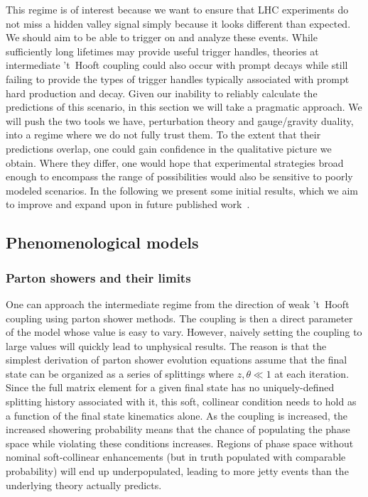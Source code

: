 This regime is of interest because we want to ensure that LHC experiments do not miss a hidden valley signal simply because it looks different than expected. We should aim to be able to trigger on and analyze these events. While sufficiently long lifetimes may provide useful trigger handles, theories at intermediate 't~Hooft coupling could also occur with prompt decays while still failing to provide the types of trigger handles typically associated with prompt hard production and decay. Given our inability to reliably calculate the predictions of this scenario, in this section we will take a pragmatic approach. We will push the two tools we have, perturbation theory and gauge/gravity duality, into a regime where we do not fully trust them. To the extent that their predictions overlap, one could gain confidence in the qualitative picture we obtain. Where they differ, one would hope that experimental strategies broad enough to encompass the range of possibilities would also be sensitive to poorly modeled scenarios. In the following we present some initial results, which we aim to improve and expand upon in future published work~\cite{showersinprogress}.


\subsection{Phenomenological models}

\subsubsection{Parton showers and their limits}

One can  approach the intermediate regime from the direction of weak 't~Hooft coupling using parton shower methods. The coupling is then a direct parameter of the model whose value is easy to vary. However, naively setting the coupling to large values will quickly lead to unphysical results. The reason is that the simplest derivation of parton shower evolution equations assume that the final state can be organized as a series of splittings where $z, \theta \ll 1$ at each iteration. Since the full matrix element for a given final state has no uniquely-defined splitting history associated with it, this soft, collinear condition needs to hold as a function of the final state kinematics alone. As the coupling is increased, the increased showering probability means that the chance of populating the phase space while violating these conditions increases. Regions of phase space without nominal soft-collinear enhancements (but in truth  populated with comparable probability) will end up underpopulated, leading to more jetty events than the underlying theory actually predicts.

